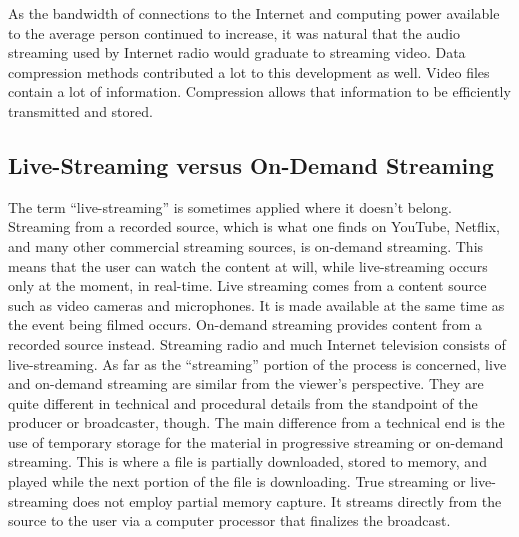 \documentclass{article}
\begin{document}
As the bandwidth of connections to the Internet and computing power available to the average person continued to increase, it was natural that the audio streaming used by Internet radio would graduate to streaming video. Data compression methods contributed a lot to this development as well. Video files contain a lot of information. Compression allows that information to be efficiently transmitted and stored.

\subsection{Live-Streaming versus On-Demand Streaming}
The term “live-streaming” is sometimes applied where it doesn’t belong. Streaming from a recorded source, which is what one finds on YouTube, Netflix, and many other commercial streaming sources, is on-demand streaming. This means that the user can watch the content at will, while live-streaming occurs only at the moment, in real-time. Live streaming comes from a content source such as video cameras and microphones. It is made available at the same time as the event being filmed occurs. On-demand streaming provides content from a recorded source instead. Streaming radio and much Internet television consists of live-streaming. As far as the “streaming” portion of the process is concerned, live and on-demand streaming are similar from the viewer’s perspective. They are quite different in technical and procedural details from the standpoint of the producer or broadcaster, though. The main difference from a technical end is the use of temporary storage for the material in progressive streaming or on-demand streaming. This is where a file is partially downloaded, stored to memory, and played while the next portion of the file is downloading. True streaming or live-streaming does not employ partial memory capture. It streams directly from the source to the user via a computer processor that finalizes the broadcast.
\end{document}
